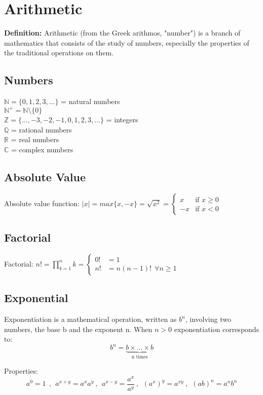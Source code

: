 \chapter{Arithmetic}
\textbf{Definition:} Arithmetic (from the Greek arithmos, "number") is a branch of mathematics that consists of the study of numbers, especially the properties of the traditional operations on them.

\section{Numbers}

$\mathbb{N} = \{0,1,2,3,...\} $ = natural numbers \\
$\mathbb{N^+} = \mathbb{N}\setminus\{0\}$ \\
$\mathbb{Z} = \{...,-3,-2,-1,0,1,2,3,...\} $ = integers \\
$\mathbb{Q}$ = rational numbers \\
$\mathbb{R}$ = real numbers \\
$\mathbb{C}$ = complex numbers

\section{Absolute Value}

Absolute value function: $ \left|x\right| = max\{x,-x\} = \sqrt{x^2} = \begin{cases}
x & \text{if } x\geq0\\
-x & \text{if } x<0
\end{cases} $

\section{Factorial}

Factorial: $ n! = \prod_{k=1}^{n}k  = \begin{cases}
0! &= 1\\
n! &= n(n-1)! \ \ \forall n\ge1
\end{cases} $

\section{Exponential}
Exponentiation is a mathematical operation, written as $b^n$, involving two numbers, the base b and the exponent n. When $n>0$ exponentiation corresponds to: $$b^n=\underbrace{b \times ... \times b}_\text{n times}$$

Properties:
\[
a^0=1 \ \ , \ \ a^{x+y}=a^xa^y \ , \ \ a^{x-y}=\frac{a^x}{a^y} \ , \ \ (a^x)^y=a^{xy} \ , \ \ (ab)^n = a^nb^n
\]


